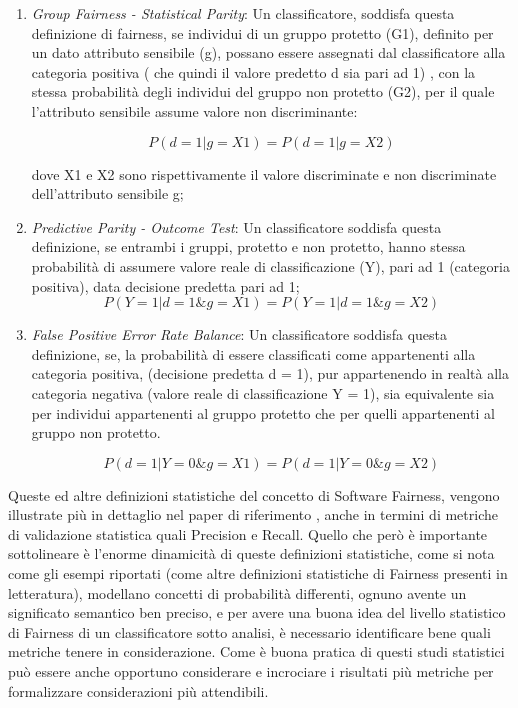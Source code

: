  
\begin{enumerate}
     \item \emph{Group Fairness - Statistical Parity}: Un classificatore, soddisfa questa definizione di fairness, se individui di un gruppo protetto (G1), definito per un dato attributo sensibile (g), possano essere assegnati dal classificatore alla categoria positiva ( che quindi il valore predetto d sia pari ad 1) , con la stessa probabilità degli individui del gruppo non protetto (G2), per il quale l'attributo sensibile assume valore non discriminante:
     
     \begin{equation*}
        P(d = 1| g = X1) = P(d = 1 | g = X2)
    \end{equation*}
     
     dove X1 e X2 sono rispettivamente il valore discriminate e non discriminate dell'attributo sensibile g;
    
     \item \emph{Predictive Parity - Outcome Test}: Un classificatore soddisfa questa definizione, se entrambi i gruppi, protetto e non protetto, hanno stessa probabilità di assumere valore reale di classificazione (Y), pari ad 1 (categoria positiva), data decisione predetta pari ad 1;
     \begin{equation*}
        P(Y = 1| d = 1 \& g = X1) = P( Y = 1 | d = 1 \& g = X2)
    \end{equation*}
    
    
     \item \emph{False Positive Error Rate Balance}: Un classificatore soddisfa questa definizione, se, la probabilità di essere classificati come appartenenti alla categoria positiva, (decisione predetta d = 1), pur appartenendo in realtà alla categoria negativa (valore reale di classificazione Y = 1), sia equivalente sia per individui appartenenti al gruppo protetto che per quelli appartenenti al gruppo non protetto.
     
     \begin{equation*}
       P(d = 1| Y = 0 \& g = X1) = P( d = 1 | Y = 0 \& g = X2)
    \end{equation*}
    
     
\end{enumerate}

Queste ed altre definizioni statistiche del concetto di Software Fairness, vengono illustrate più in dettaglio nel paper di riferimento \cite{evalFairClassification}, anche in termini di metriche di validazione statistica quali Precision e Recall. Quello che però è importante sottolineare è l'enorme dinamicità di queste definizioni statistiche, come  si nota come gli esempi riportati (come altre definizioni statistiche di Fairness presenti in letteratura), modellano concetti di probabilità differenti, ognuno avente un significato semantico ben preciso, e per avere una buona idea del livello statistico di Fairness di un classificatore sotto analisi, è necessario identificare bene quali metriche tenere in considerazione. Come è buona pratica di questi studi statistici può essere anche opportuno considerare e incrociare i risultati più metriche per formalizzare considerazioni più attendibili.

